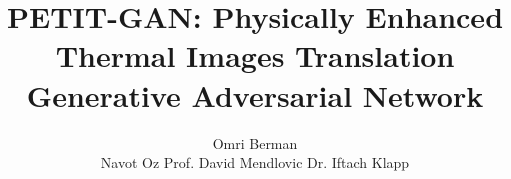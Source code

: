 \title{PETIT-GAN: Physically Enhanced Thermal Images Translation Generative Adversarial Network}	
\author[Omri Berman Dr. Iftach Klapp Navot Oz]{Omri Berman \\[.2cm]{\scriptsize Navot Oz \qquad Prof. David Mendlovic \qquad Dr. Iftach Klapp}}



\begin{frame}[plain]
    \titlepage
\end{frame}
  